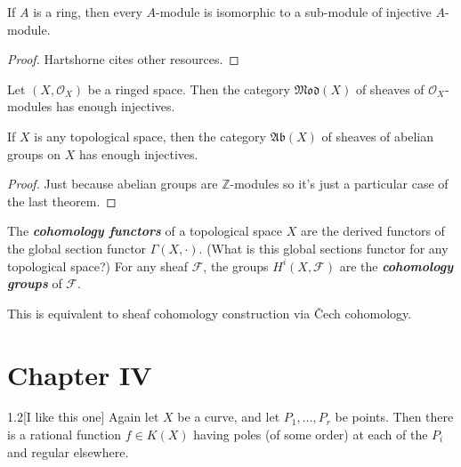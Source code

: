 \begin{prop}
	If $A$ is a ring, then every $A$-module is isomorphic to a sub-module of injective $A$-module.
\end{prop}

\begin{proof}
	Hartshorne cites other resources.
\end{proof}

\begin{prop}
	Let  $(X,\mathcal{O}_X)$ be a ringed space. Then the category $\mathfrak{Mod}(X)$ of sheaves of $\mathcal{O}_X$-modules has enough injectives.
\end{prop}

\begin{coro}
	If $X$ is any topological space, then the category $\mathfrak{Ab}(X)$ of sheaves of abelian groups on $X$ has enough injectives.
\end{coro}

\begin{proof}
	Just because abelian groups are $\mathbb{Z}$-modules so it's just a particular case of the last theorem.
\end{proof}

\begin{defn}
	The \textit{\textbf{cohomology functors}} of a topological space $X$ are the derived functors of the global section functor $\Gamma(X,\cdot)$. {\color{magenta}(What is this global sections functor for any topological space?)} For any sheaf $\mathcal{F}$, the groups $H^{i}(X,\mathcal{F})$ are the \textit{\textbf{cohomology groups}} of  $\mathcal{F}$.
\end{defn}

\begin{remark}
	This is equivalent to sheaf cohomology construction via \v Cech cohomology.
\end{remark}

\section{Chapter IV}

\begin{manualexercise}{1.2}[I like this one]
	Again let $X$ be a curve, and let $P_1,\ldots,P_r$ be points. Then there is a rational  function $f\in K(X)$ having poles (of some order) at each of the $P_i$ and regular  elsewhere.  
\end{manualexercise}

